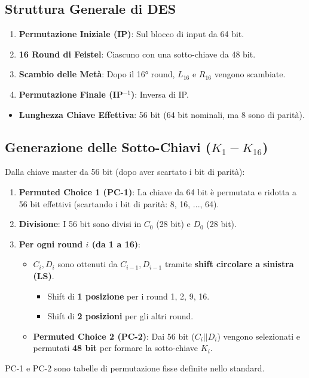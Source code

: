 \documentclass{article}
\begin{document}
\subsection{Struttura Generale di DES}
\begin{enumerate}
    \item \textbf{Permutazione Iniziale (IP)}: Sul blocco di input da 64 bit.
    \item \textbf{16 Round di Feistel}: Ciascuno con una sotto-chiave da 48 bit.
    \item \textbf{Scambio delle Metà}: Dopo il 16° round, $L_{16}$ e $R_{16}$ vengono scambiate.
    \item \textbf{Permutazione Finale (IP$^{-1}$)}: Inversa di IP.
\end{enumerate}
\begin{itemize}
    \item \textbf{Lunghezza Chiave Effettiva}: 56 bit (64 bit nominali, ma 8 sono di parità).
\end{itemize}

\subsection{Generazione delle Sotto-Chiavi ($K_1 - K_{16}$)}
Dalla chiave master da 56 bit (dopo aver scartato i bit di parità):
\begin{enumerate}
    \item \textbf{Permuted Choice 1 (PC-1)}: La chiave da 64 bit è permutata e ridotta a 56 bit effettivi (scartando i bit di parità: 8, 16, ..., 64).
    \item \textbf{Divisione}: I 56 bit sono divisi in $C_0$ (28 bit) e $D_0$ (28 bit).
    \item \textbf{Per ogni round $i$ (da 1 a 16)}:
    \begin{itemize}
        \item $C_i, D_i$ sono ottenuti da $C_{i-1}, D_{i-1}$ tramite \textbf{shift circolare a sinistra (LS)}.
        \begin{itemize}
            \item Shift di \textbf{1 posizione} per i round 1, 2, 9, 16.
            \item Shift di \textbf{2 posizioni} per gli altri round.
        \end{itemize}
        \item \textbf{Permuted Choice 2 (PC-2)}: Dai 56 bit ($C_i || D_i$) vengono selezionati e permutati \textbf{48 bit} per formare la sotto-chiave $K_i$.
    \end{itemize}
\end{enumerate}
PC-1 e PC-2 sono tabelle di permutazione fisse definite nello standard.
\end{document}
